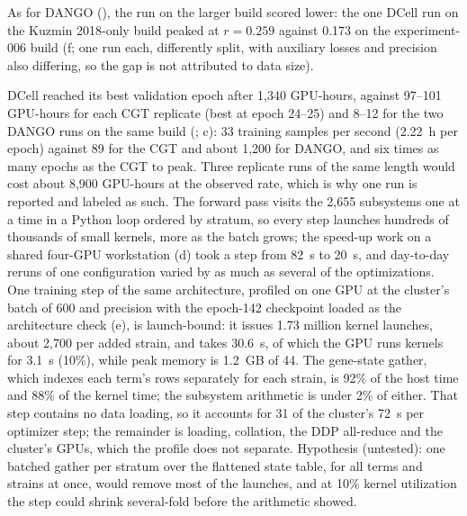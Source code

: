 As for DANGO (), the run on the larger build scored lower: the
one DCell run on the Kuzmin 2018-only build peaked at $r=0.259$ against 0.173 on the
experiment-006 build (f; one run each, differently split, with
auxiliary losses and precision also differing, so the gap is not attributed to data size).

 DCell reached its best validation epoch after 1,340
GPU-hours, against 97--101 GPU-hours for each CGT replicate (best at epoch 24--25) and 8--12
for the two DANGO runs on the same build (;
c): 33 training samples per second (2.22~h per epoch) against 89
for the CGT and about 1,200 for DANGO, and six times as many epochs as the CGT to peak. Three
replicate runs of the same length would cost about 8,900 GPU-hours at the observed rate,
which is why one run is reported and labeled as such. The forward pass visits the 2,655
subsystems one at a time in a Python loop ordered by stratum, so every step launches
hundreds of thousands of small kernels, more as the batch grows; the speed-up work on a shared four-GPU
workstation (d) took a step from 82~s to 20~s, and day-to-day
reruns of one configuration varied by as much as several of the optimizations. One
training step of the same architecture, profiled on one GPU at the cluster's batch of
600 and precision with the epoch-142 checkpoint loaded as the architecture check
(e), is launch-bound: it issues 1.73 million kernel launches,
about 2,700 per added strain, and takes 30.6~s, of which the GPU runs kernels for 3.1~s
(10\%), while peak memory is 1.2~GB of 44. The gene-state gather, which indexes each
term's rows separately for each strain, is 92\% of the host time and 88\% of the kernel
time; the subsystem arithmetic is under 2\% of either. That step contains no data
loading, so it accounts for 31 of the cluster's 72~s per optimizer step; the remainder is
loading, collation, the DDP all-reduce and the cluster's GPUs, which the profile does not
separate. Hypothesis (untested): one batched gather per stratum over the flattened state
table, for all terms and strains at once, would remove most of the launches, and at 10\%
kernel utilization the step could shrink several-fold before the arithmetic showed.

